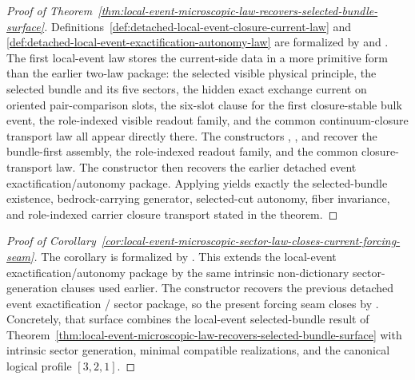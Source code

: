 \begin{proof}[Proof of Theorem~\ref{thm:local-event-microscopic-law-recovers-selected-bundle-surface}]
\label{proof:thm:local-event-microscopic-law-recovers-selected-bundle-surface}
Definitions~\ref{def:detached-local-event-closure-current-law} and
\ref{def:detached-local-event-exactification-autonomy-law} are formalized by
 and
. The first local-event law
stores the current-side data in a more primitive form than the earlier
two-law package: the selected visible physical principle, the selected bundle
and its five sectors, the hidden exact exchange current on oriented
pair-comparison slots, the six-slot clause for the first closure-stable bulk
event, the role-indexed visible readout family, and the common
continuum-closure transport law all appear directly there. The constructors
,
, and
 recover the
bundle-first assembly, the role-indexed readout family, and the common
closure-transport law. The constructor
 then
recovers the earlier detached event exactification/autonomy package. Applying
 yields exactly the
selected-bundle existence, bedrock-carrying generator, selected-cut autonomy,
fiber invariance, and role-indexed carrier closure transport stated in the
theorem.
\end{proof}

\begin{proof}[Proof of Corollary~\ref{cor:local-event-microscopic-sector-law-closes-current-forcing-seam}]
\label{proof:cor:local-event-microscopic-sector-law-closes-current-forcing-seam}
The corollary is formalized by . This
extends the local-event exactification/autonomy package by the same intrinsic
non-dictionary sector-generation clauses used earlier. The constructor
recovers the previous detached event exactification / sector package, so the
present forcing seam closes by
. Concretely, that surface
combines the local-event selected-bundle result of
Theorem~\ref{thm:local-event-microscopic-law-recovers-selected-bundle-surface}
with intrinsic sector generation, minimal compatible realizations, and the
canonical logical profile \([3,2,1]\).
\end{proof}

